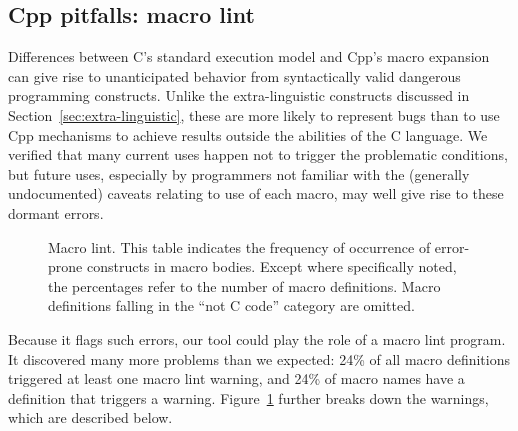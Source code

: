 \documentclass[10pt]{article}
\newcommand{\captionsmall}[1]{\caption[]{\small #1}}
\begin{document}
\subsection{Cpp pitfalls:  macro lint}
\label{sec:lint}

Differences between C's standard execution model and Cpp's macro expansion can
give rise to unanticipated behavior from syntactically valid dangerous
programming constructs.  Unlike the extra-linguistic constructs discussed
in Section~\ref{sec:extra-linguistic}, these are more likely to represent bugs
than to use Cpp mechanisms to achieve results outside the abilities of the
C language.  We verified that many current uses happen not to trigger the
problematic conditions, but future uses, especially by programmers not
familiar with the (generally undocumented) caveats relating to use of each
macro, may well give rise to these dormant errors.

\begin{figure}
  {\small\centerline{}}
  
  \captionsmall{Macro lint.  This table indicates the frequency of occurrence of
    error-prone constructs in macro bodies.  Except where specifically
    noted, the percentages refer to the number of macro definitions.  Macro
    definitions falling in the ``not C code'' category are omitted.}
  \label{fig:macro-lint}
\end{figure}

Because it flags such errors, our tool could play the role of a macro lint
program.  It discovered many more problems than we expected: 24\% of all
macro definitions triggered at least one macro lint warning, and 24\% of
macro names have a definition that triggers a warning.
Figure~\ref{fig:macro-lint} further breaks down the warnings, which are
described below.
\end{document}
